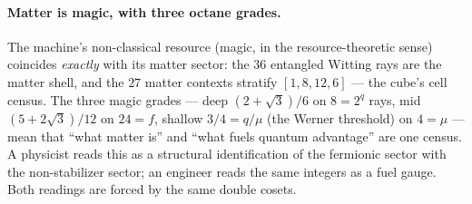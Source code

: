 \documentclass[11pt]{article}
\begin{document}
\paragraph{Matter is magic, with three octane grades.}
The machine's non-classical resource (magic, in the resource-theoretic
sense) coincides \emph{exactly} with its matter sector: the $36$
entangled Witting rays are the matter shell, and the $27$ matter
contexts stratify $[1,8,12,6]$ --- the cube's cell census.  The three
magic grades --- deep $(2+\sqrt3)/6$ on $8=2^q$ rays, mid
$(5+2\sqrt3)/12$ on $24=f$, shallow $3/4=q/\mu$ (the Werner
threshold) on $4=\mu$ --- mean that ``what matter is'' and ``what
fuels quantum advantage'' are one census.  A physicist reads this as
a structural identification of the fermionic sector with the
non-stabilizer sector; an engineer reads the same integers as a fuel
gauge.  Both readings are forced by the same double cosets.
\end{document}
